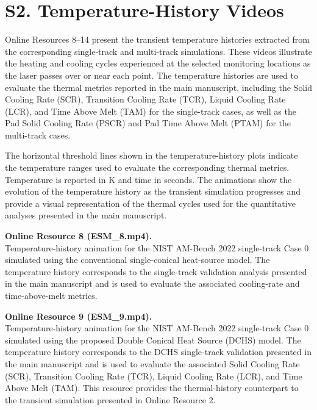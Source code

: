 \documentclass[11pt]{article}
\begin{document}
\medskip

\section*{S2. Temperature-History Videos}

Online Resources 8--14 present the transient temperature histories
extracted from the corresponding single-track and multi-track simulations.
These videos illustrate the heating and cooling cycles experienced at the
selected monitoring locations as the laser passes over or near each point.
The temperature histories are used to evaluate the thermal metrics reported
in the main manuscript, including the Solid Cooling Rate (SCR), Transition
Cooling Rate (TCR), Liquid Cooling Rate (LCR), and Time Above Melt (TAM)
for the single-track cases, as well as the Pad Solid Cooling Rate (PSCR)
and Pad Time Above Melt (PTAM) for the multi-track cases.

The horizontal threshold lines shown in the temperature-history plots
indicate the temperature ranges used to evaluate the corresponding thermal
metrics. Temperature is reported in K and time in seconds. The animations
show the evolution of the temperature history as the transient simulation
progresses and provide a visual representation of the thermal cycles used
for the quantitative analyses presented in the main manuscript.

\textbf{Online Resource 8 (ESM\_8.mp4).}\\
Temperature-history animation for the NIST AM-Bench 2022 single-track
Case 0 simulated using the conventional single-conical heat-source model.
The temperature history corresponds to the single-track validation analysis
presented in the main manuscript and is used to evaluate the associated
cooling-rate and time-above-melt metrics.

\medskip

\textbf{Online Resource 9 (ESM\_9.mp4).}\\
Temperature-history animation for the NIST AM-Bench 2022 single-track
Case 0 simulated using the proposed Double Conical Heat Source (DCHS)
model. The temperature history corresponds to the DCHS single-track
validation presented in the main manuscript and is used to evaluate
the associated Solid Cooling Rate (SCR), Transition Cooling Rate (TCR),
Liquid Cooling Rate (LCR), and Time Above Melt (TAM). This resource
provides the thermal-history counterpart to the transient simulation
presented in Online Resource 2.
\end{document}
